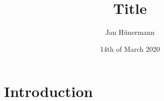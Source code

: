 \documentclass{article}
\title{Title}
\author{Jan Hünermann}
\date{14th of March 2020}
\begin{document}
\maketitle

\section{Introduction}
\end{document}
